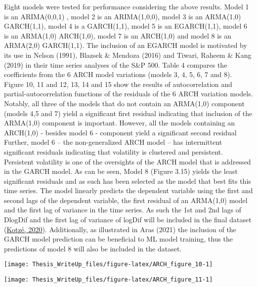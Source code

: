 \documentclass[11pt,preprint, authoryear]{elsarticle}
\let\origfigure\figure
\let\endorigfigure\endfigure
\renewenvironment{figure}[1][2] {
    \expandafter\origfigure\expandafter[H]
} {
    \endorigfigure
}
\numberwithin{equation}{section}
\numberwithin{figure}{section}
\numberwithin{table}{section}
\begin{document}
Eight models were tested for performance considering the above results.
Model 1 is an ARIMA(0,0,1) , model 2 is an ARIMA(1,0,0), model 3 is an
ARMA(1,0) GARCH(1,1), model 4 is a GARCH(1,1), model 5 is an
EGARCH(1,1), model 6 is an ARMA(1,0) ARCH(1,0), model 7 is an ARCH(1,0)
and model 8 is an ARMA(2,0) GARCH(1,1). The inclusion of an EGARCH model
is motivated by its use in Nelson (1991), Blazsek \& Mendoza (2016) and
Tiwari, Raheem \& Kang (2019) in their time series analyses of the S\&P
500. Table 4 compares the coefficients from the 6 ARCH model variations
(models 3, 4, 5, 6, 7 and 8). Figure 10, 11 and 12, 13, 14 and 15 show
the results of autocorrelation and partial-autocorrelation functions of
the residuals of the 6 ARCH variation models. Notably, all three of the
models that do not contain an ARMA(1,0) component (models 4,5 and 7)
yield a significant first residual indicating that inclusion of the
ARMA(1,0) component is important. However, all the models containing an
ARCH(1,0) - besides model 6 - component yield a significant second
residual Further, model 6 -- the non-generalized ARCH model -- has
intermittent significant residuals indicating that volatility is
clustered and persistent. Persistent volatility is one of the oversights
of the ARCH model that is addressed in the GARCH model. As can be seen,
Model 8 (Figure 3.15) yields the least significant residuals and as such
has been selected as the model that best fits this time series. The
model linearly predicts the dependent variable using the first and
second lags of the dependent variable, the first residual of an
ARMA(1,0) model and the first lag of variance in the time series. As
such the 1st and 2nd lags of DlogDif and the first lag of variance of
logDif will be included in the final dataset
(\protect\hyperlink{ref-kotze2020univariate}{Kotzé, 2020}).
Additionally, as illustrated in Aras (2021) the inclusion of the GARCH
model prediction can be beneficial to ML model training, thus the
predictions of model 8 will also be included in the dataset.

\begin{figure}[H]

{\centering \texttt{[image: Thesis\_WriteUp\_files/figure-latex/ARCH\_figure\_10-1]} 

}

\caption{Autocorrelation and partial-autocorrelation functions of model 3 - ARMA(1,0) GARCH(1,1) - residuals \label{Figure9}}\label{fig:ARCH_figure_10}
\end{figure}

\begin{figure}[H]

{\centering \texttt{[image: Thesis\_WriteUp\_files/figure-latex/ARCH\_figure\_11-1]} 

}

\caption{Autocorrelation and partial-autocorrelation functions of model 4 - GARCH(1,1) -  residuals \label{Figure9}}\label{fig:ARCH_figure_11}
\end{figure}
\end{document}
